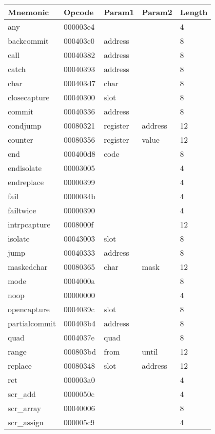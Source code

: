 
\begin{center}
\caption{Naigama Bytecode Instructions}
\label{tab:naig_bytecode}
\begin{longtable}{lllll}
\textbf{Mnemonic} & \textbf{Opcode} & \textbf{Param1} & \textbf{Param2} & \textbf{Length} \\
\endhead
any & 000003e4 &  &   & 4 \\
backcommit & 000403c0 & address &   & 8 \\
call & 00040382 & address &   & 8 \\
catch & 00040393 & address &   & 8 \\
char & 000403d7 & char &   & 8 \\
closecapture & 00040300 & slot &   & 8 \\
commit & 00040336 & address &   & 8 \\
condjump & 00080321 & register & address  & 12 \\
counter & 00080356 & register & value  & 12 \\
end & 000400d8 & code &   & 8 \\
endisolate & 00003005 &  &   & 4 \\
endreplace & 00000399 &  &   & 4 \\
fail & 0000034b &  &   & 4 \\
failtwice & 00000390 &  &   & 4 \\
intrpcapture & 0008000f &  &   & 12 \\
isolate & 00043003 & slot &   & 8 \\
jump & 00040333 & address &   & 8 \\
maskedchar & 00080365 & char & mask  & 12 \\
mode & 0004000a &  &   & 8 \\
noop & 00000000 &  &   & 4 \\
opencapture & 0004039c & slot &   & 8 \\
partialcommit & 000403b4 & address &   & 8 \\
quad & 0004037e & quad &   & 8 \\
range & 000803bd & from & until  & 12 \\
replace & 00080348 & slot & address  & 12 \\
ret & 000003a0 &  &   & 4 \\
scr\_add & 0000050c &  &   & 4 \\
scr\_array & 00040006 &  &   & 8 \\
scr\_assign & 000005c9 &  &   & 4 \\

\end{longtable}
\end{center}
